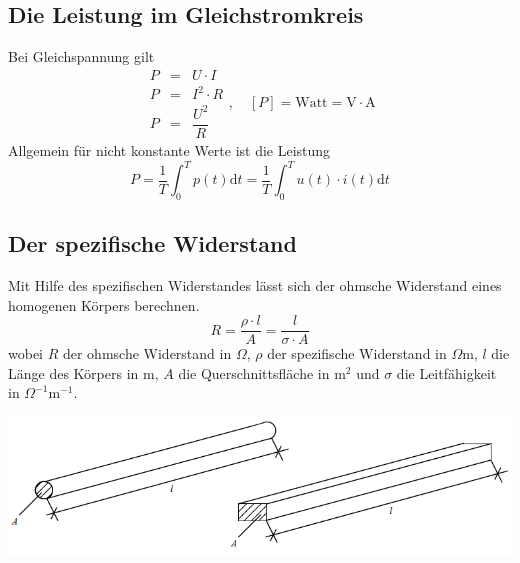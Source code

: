 \subsection{Die Leistung im Gleichstromkreis}
Bei Gleichspannung gilt
\begin{equation}
\boxed{\begin{array}{lll}P&=&U\cdot I\\P&=&I^2\cdot R\\P&=&\dfrac{U^2}{R}\end{array},\quad [P]=\text{Watt}=\text{V}\cdot \text{A}}
\end{equation}
Allgemein für nicht konstante Werte ist die Leistung
\begin{equation}
\boxed{P=\dfrac{1}{T}\displaystyle \int_0^Tp\left(t\right)\text{d}t=\dfrac{1}{T}\displaystyle \int_0^Tu\left(t\right)\cdot i\left(t\right)\text{d}t}
\end{equation}
\subsection{Der spezifische Widerstand}
Mit Hilfe des spezifischen Widerstandes lässt sich der ohmsche Widerstand eines homogenen Körpers berechnen.
\begin{equation}
\boxed{R=\dfrac{\rho\cdot l}{A}=\dfrac{l}{\sigma\cdot A}}
\end{equation}
wobei $R$ der ohmsche Widerstand in $\Omega$, $\rho$ der spezifische Widerstand in $\Omega\text{m}$, $l$ die Länge des Körpers in $\text{m}$, $A$ die Querschnittsfläche in $\text{m}^2$ und $\sigma$ die Leitfähigkeit in $\Omega^{-1}\text{m}^{-1}$.
\begin{center}
\includegraphics[scale=0.5]{../img/II/IIb}
\end{center}
